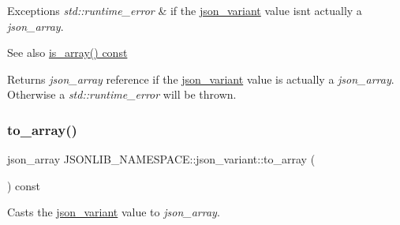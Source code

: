 \begin{DoxyExceptions}{Exceptions}
{\em std\+::runtime\+\_\+error} & if the \hyperlink{classJSONLIB__NAMESPACE_1_1json__variant}{json\+\_\+variant} value isn\textquotesingle{}t actually a {\itshape json\+\_\+array}. \\
\hline
\end{DoxyExceptions}
\begin{DoxySeeAlso}{See also}
\hyperlink{classJSONLIB__NAMESPACE_1_1json__variant_a72349dff71a411ac24eea6d943772df7}{is\+\_\+array() const} 
\end{DoxySeeAlso}
\begin{DoxyReturn}{Returns}
{\itshape json\+\_\+array} reference if the \hyperlink{classJSONLIB__NAMESPACE_1_1json__variant}{json\+\_\+variant} value is actually a {\itshape json\+\_\+array}. Otherwise a {\itshape std\+::runtime\+\_\+error} will be thrown. 
\end{DoxyReturn}
\mbox{\label{classJSONLIB__NAMESPACE_1_1json__variant_a9c7e9d81370ff98393d2fd3ee00d013a}} 
\subsubsection{\texorpdfstring{to\+\_\+array()}{to\_array()}\hspace{0.1cm}{\footnotesize\ttfamily [3/4]}}
{\footnotesize\ttfamily json\+\_\+array J\+S\+O\+N\+L\+I\+B\+\_\+\+N\+A\+M\+E\+S\+P\+A\+C\+E\+::json\+\_\+variant\+::to\+\_\+array (\begin{DoxyParamCaption}{ }\end{DoxyParamCaption}) const}



Casts the \hyperlink{classJSONLIB__NAMESPACE_1_1json__variant}{json\+\_\+variant} value to {\itshape json\+\_\+array}. 


